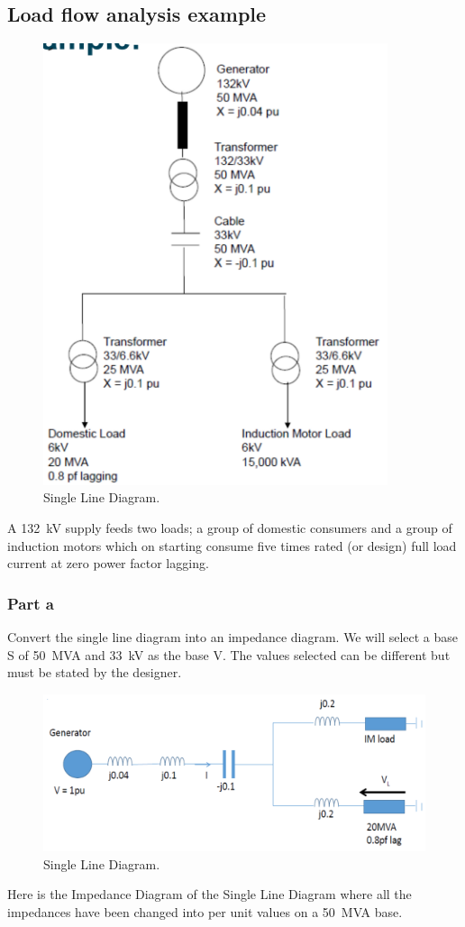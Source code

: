 \documentclass[class=report, crop=false, 12pt,a4paper]{standalone}
\begin{document}
\subsection{Load flow analysis example}
\begin{figure}[H]
	\centering
	\includegraphics[width = 0.9\textwidth]{../img/figure15.png}
	\caption{Single Line Diagram.}
\end{figure}
A \SI{132}{kV} supply feeds two loads; a group of domestic consumers and a group of induction motors which on starting consume five times rated (or design) full load current at zero power factor lagging.
\subsubsection{Part a}
Convert the single line diagram into an impedance diagram. We will select a base S of \SI{50}{MVA} and \SI{33}{kV} as the base V. The values selected can be different but must be stated by the designer.
\begin{figure}[H]
	\centering
	\includegraphics[width =  \textwidth]{../img/figure16.png}
	\caption{Single Line Diagram.}
\end{figure}
Here is the Impedance Diagram of the Single Line Diagram where all the impedances have been changed into per unit values on a \SI{50}{MVA} base.
\end{document}
